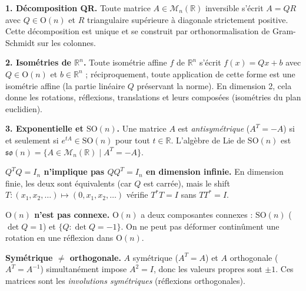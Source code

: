 \decsep{}



\begin{mdframed}[style=exbar]
  \textbf{1. Décomposition QR.}\enspace%
  Toute matrice $A \in \mathcal{M}_n(\mathbb{R})$ inversible s'écrit $A = QR$
  avec $Q \in \mathrm{O}(n)$ et $R$ triangulaire supérieure à diagonale strictement
  positive. Cette décomposition est unique et se construit par orthonormalisation
  de Gram-Schmidt sur les colonnes.

  \smallskip\noindent
  \textbf{2. Isométries de $\mathbb{R}^n$.}\enspace%
  Toute isométrie affine $f$ de $\mathbb{R}^n$ s'écrit $f(x) = Qx + b$ avec
  $Q\in\mathrm{O}(n)$ et $b\in\mathbb{R}^n$ ; réciproquement, toute application de
  cette forme est une isométrie affine (la partie linéaire $Q$ préservant la norme).
  En dimension 2, cela donne les rotations, réflexions, translations et leurs
  composées (isométries du plan euclidien).

  \smallskip\noindent
  \textbf{3. Exponentielle et $\mathrm{SO}(n)$.}\enspace%
  Une matrice $A$ est \emph{antisymétrique} ($A^T=-A$) si et seulement si
  $e^{tA} \in \mathrm{SO}(n)$ pour tout $t \in \mathbb{R}$.
  L'algèbre de Lie de $\mathrm{SO}(n)$ est
  $\mathfrak{so}(n) = \{A \in \mathcal{M}_n(\mathbb{R}) \mid A^T = -A\}$.
\end{mdframed}


\begin{mdframed}[style=cexbar]
  \textbf{$Q^TQ = I_n$ n'implique pas $QQ^T = I_n$ en dimension infinie.}\enspace%
  En dimension finie, les deux sont équivalents (car $Q$ est carrée), mais le
  shift $T : (x_1,x_2,\ldots)\mapsto(0,x_1,x_2,\ldots)$ vérifie $T^*T=I$
  sans $TT^*=I$.

  \smallskip\noindent
  \textbf{$\mathrm{O}(n)$ n'est pas connexe.}\enspace%
  $\mathrm{O}(n)$ a deux composantes connexes : $\mathrm{SO}(n)$ ($\det Q = 1$)
  et $\{Q : \det Q=-1\}$. On ne peut pas déformer continûment une rotation
  en une réflexion dans $\mathrm{O}(n)$.

  \smallskip\noindent
  \textbf{Symétrique $\neq$ orthogonale.}\enspace%
  $A$ symétrique ($A^T=A$) et $A$ orthogonale ($A^T=A^{-1}$) simultanément
  impose $A^2=I$, donc les valeurs propres sont $\pm 1$.
  Ces matrices sont les \emph{involutions symétriques} (réflexions orthogonales).
\end{mdframed}

